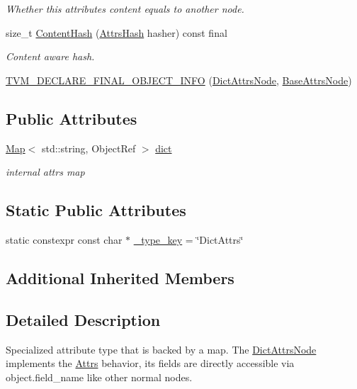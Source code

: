\begin{DoxyCompactItemize}
\begin{DoxyCompactList}\small\item\em Whether this attribute\textquotesingle{}s content equals to another node. \end{DoxyCompactList}\item 
size\+\_\+t \hyperlink{classtvm_1_1DictAttrsNode_a92e852ca387558588474c9e1c503e3ee}{Content\+Hash} (\hyperlink{classtvm_1_1AttrsHash}{Attrs\+Hash} hasher) const final
\begin{DoxyCompactList}\small\item\em Content aware hash. \end{DoxyCompactList}\item 
\hyperlink{classtvm_1_1DictAttrsNode_a064a2af1c7fbe5140278e28cc5ec8c78}{T\+V\+M\+\_\+\+D\+E\+C\+L\+A\+R\+E\+\_\+\+F\+I\+N\+A\+L\+\_\+\+O\+B\+J\+E\+C\+T\+\_\+\+I\+N\+FO} (\hyperlink{classtvm_1_1DictAttrsNode}{Dict\+Attrs\+Node}, \hyperlink{classtvm_1_1BaseAttrsNode}{Base\+Attrs\+Node})
\end{DoxyCompactItemize}
\subsection*{Public Attributes}
\begin{DoxyCompactItemize}
\item 
\hyperlink{classtvm_1_1Map}{Map}$<$ std\+::string, Object\+Ref $>$ \hyperlink{classtvm_1_1DictAttrsNode_a84b24dd355be6b65a0748d4b4e02feed}{dict}
\begin{DoxyCompactList}\small\item\em internal attrs map \end{DoxyCompactList}\end{DoxyCompactItemize}
\subsection*{Static Public Attributes}
\begin{DoxyCompactItemize}
\item 
static constexpr const char $\ast$ \hyperlink{classtvm_1_1DictAttrsNode_aaef3e4d948905fc26a25d5ea8fd15c27}{\+\_\+type\+\_\+key} = \char`\"{}Dict\+Attrs\char`\"{}
\end{DoxyCompactItemize}
\subsection*{Additional Inherited Members}


\subsection{Detailed Description}
Specialized attribute type that is backed by a map. The \hyperlink{classtvm_1_1DictAttrsNode}{Dict\+Attrs\+Node} implements the \hyperlink{classtvm_1_1Attrs}{Attrs} behavior, its fields are directly accessible via object.\+field\+\_\+name like other normal nodes. 

